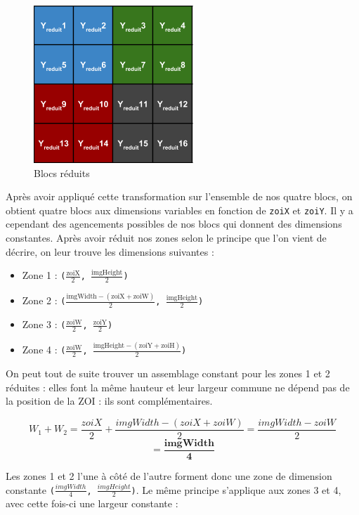 \documentclass[11pt,a4paper]{article}
\begin{document}
\begin{figure}[H]
\begin{center}
\includegraphics[scale=0.5]{images/yuv4.png}
\end{center}
\caption{Blocs réduits}
\label{}
\end{figure}

\bigbreak
Après avoir appliqué cette transformation sur l'ensemble de nos quatre blocs, on obtient quatre blocs aux dimensions variables en fonction de \texttt{zoiX} et \texttt{zoiY}.
Il y a cependant des agencements possibles de nos blocs qui donnent des dimensions constantes.
Après avoir réduit nos zones selon le principe que l'on vient de décrire, on leur trouve les dimensions suivantes :

\bigbreak
\begin{itemize}
\item{Zone 1 : \texttt{($\frac{\text{zoiX}}{2}$, $\frac{\text{imgHeight}}{2}$)}}
\item{Zone 2 : \texttt{($\frac{\text{imgWidth}-(\text{zoiX}+\text{zoiW})}{2}$, $\frac{\text{imgHeight}}{2}$)}}
\item{Zone 3 : \texttt{($\frac{\text{zoiW}}{2}$, $\frac{\text{zoiY}}{2}$)}}
\item{Zone 4 : \texttt{($\frac{\text{zoiW}}{2}$, $\frac{\text{imgHeight}-(\text{zoiY}+\text{zoiH})}{2}$)}}
\end{itemize}

\bigbreak
On peut tout de suite trouver un assemblage constant pour les zones 1 et 2 réduites : elles font la même hauteur et leur largeur commune ne dépend pas de la position de la ZOI : ils sont complémentaires.

$$ W_1 + W_2 = \frac{zoiX}{2} + \frac{imgWidth-(zoiX+zoiW)}{2} = \frac{imgWidth - zoiW}{2}$$
$$ = \mathbf{\frac{imgWidth}{4}} $$

\bigbreak
Les zones 1 et 2 l'une à côté de l'autre forment donc une zone de dimension constante \texttt{($\frac{imgWidth}{4}$, $\frac{imgHeight}{2}$)}.
Le même principe s'applique aux zones 3 et 4, avec cette fois-ci une largeur constante :
\end{document}
